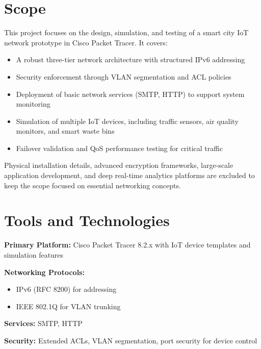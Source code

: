 \documentclass[12pt,a4paper]{article}
\begin{document}
\section*{Scope}
{}
This project focuses on the design, simulation, and testing of a smart city IoT network prototype in Cisco Packet Tracer. It covers:
\begin{itemize}[nosep]
    \item A robust three-tier network architecture with structured IPv6 addressing
    \item Security enforcement through VLAN segmentation and ACL policies
    \item Deployment of basic network services (SMTP, HTTP) to support system monitoring
    \item Simulation of multiple IoT devices, including traffic sensors, air quality monitors, and smart waste bins
    \item Failover validation and QoS performance testing for critical traffic
\end{itemize}

Physical installation details, advanced encryption frameworks, large-scale application development, and deep real-time analytics platforms are excluded to keep the scope focused on essential networking concepts.

\section*{Tools and Technologies}
{}
\textbf{Primary Platform:} Cisco Packet Tracer 8.2.x with IoT device templates and simulation features

\textbf{Networking Protocols:}
\begin{itemize}[nosep]
    \item IPv6 (RFC 8200) for addressing
    \item IEEE 802.1Q for VLAN trunking
\end{itemize}

\textbf{Services:} SMTP, HTTP

\textbf{Security:} Extended ACLs, VLAN segmentation, port security for device control

\newpage
\end{document}
